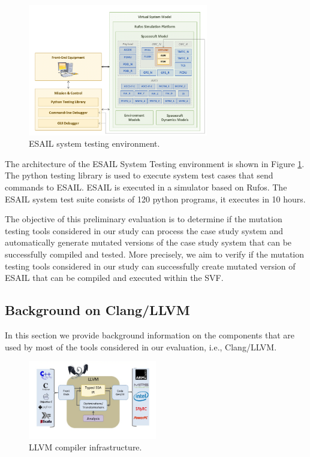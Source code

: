 \begin{figure}[h]
	\centering
    \includegraphics[width=0.7\textwidth]{images/esail}
    \caption{ESAIL system testing environment.}
    \label{fig:esail}
\end{figure}

The architecture of the ESAIL System Testing environment is shown in Figure \ref{fig:esail}. The python testing library is used to execute system test cases that send commands to ESAIL. ESAIL is executed in a simulator based on Rufos. The ESAIL system test suite consists of 120 python programs, it executes in 10 hours.

The objective of this preliminary evaluation is to determine if the mutation testing tools considered in our study can process the case study system and automatically generate mutated versions of the case study system that can be successfully compiled and tested. More precisely, we aim to verify if the mutation testing tools considered in our study can successfully create mutated version of ESAIL that can be compiled and executed within the SVF.

\subsection{Background on Clang/LLVM}
\label{subsec:background}

In this section we provide background information on the components that are used by most of the tools considered in our evaluation, i.e., Clang/LLVM.


\begin{figure}[h]
	\centering
    \includegraphics[width=0.5\textwidth]{images/llvm}
    \caption{LLVM compiler infrastructure.}
    \label{fig:llvm}
\end{figure}

